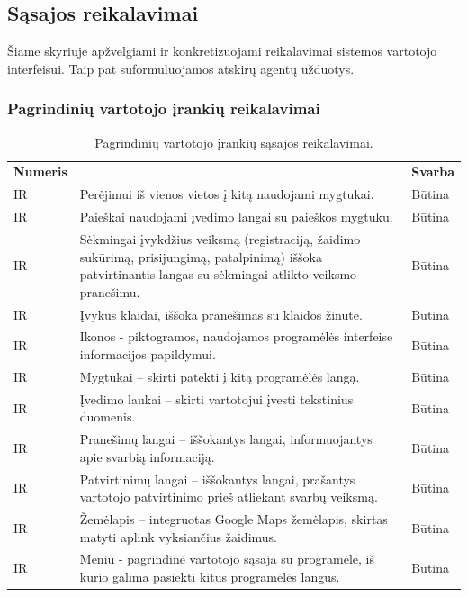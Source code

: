 \documentclass{VUMIFPSkursinis}
\begin{document}
\subsection{Sąsajos reikalavimai}
Šiame skyriuje apžvelgiami ir konkretizuojami reikalavimai sistemos vartotojo interfeisui. Taip pat suformuluojamos atskirų agentų užduotys.

\newcommand\rownumberir{\stepcounter{ircount}\arabic{ircount}}

\subsubsection{Pagrindinių vartotojo įrankių reikalavimai}
\begin{longtable}{ | >{\centering}m{2cm} | m{10cm} | >{\centering}m{2.5cm} | } \caption{Pagrindinių vartotojo įrankių sąsajos reikalavimai.} \endhead \hline
\multicolumn{3}{ |l| }{\textbf{Pagrindinių vartotojo įrankių reikalavimai}} \tabularnewline \hline
\textbf{Numeris} & \centering{\textbf{Reikalavimas}} & \textbf{Svarba} \tabularnewline \hline
IR\rownumberir & Perėjimui iš vienos vietos į kitą naudojami mygtukai. & Būtina\tabularnewline \hline
IR\rownumberir & Paieškai naudojami įvedimo langai su paieškos mygtuku. & Būtina\tabularnewline \hline
IR\rownumberir & Sėkmingai įvykdžius veiksmą (registraciją, žaidimo sukūrimą, prisijungimą, patalpinimą) iššoka patvirtinantis langas su sėkmingai atlikto veiksmo pranešimu. & Būtina\tabularnewline \hline
IR\rownumberir & Įvykus klaidai, iššoka pranešimas su klaidos žinute. & Būtina\tabularnewline \hline
IR\rownumberir & Ikonos - piktogramos, naudojamos programėlės interfeise informacijos papildymui. & Būtina\tabularnewline \hline
IR\rownumberir & Mygtukai – skirti patekti į kitą programėlės langą. & Būtina\tabularnewline \hline
IR\rownumberir & Įvedimo laukai – skirti vartotojui įvesti tekstinius duomenis. & Būtina\tabularnewline \hline
IR\rownumberir & Pranešimų langai – iššokantys langai, informuojantys apie svarbią informaciją. & Būtina\tabularnewline \hline
IR\rownumberir & Patvirtinimų langai – iššokantys langai, prašantys vartotojo patvirtinimo prieš atliekant svarbų veiksmą. & Būtina\tabularnewline \hline
IR\rownumberir & Žemėlapis – integruotas Google Maps žemėlapis, skirtas matyti aplink vyksiančius žaidimus. & Būtina\tabularnewline \hline
IR\rownumberir & Meniu - pagrindinė vartotojo sąsaja su programėle, iš kurio galima pasiekti kitus programėlės langus. & Būtina\tabularnewline \hline
\end{longtable}
\end{document}
